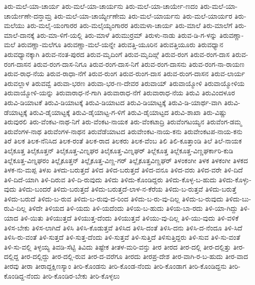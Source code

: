 ತಿರು-ಮಲೆ-ಯಾ-ಚಾರ್ಯ
ತಿರು-ಮಲೆ-ಯಾ-ಚಾರ್ಯನು
ತಿರು-ಮಲೆ-ಯಾ-ಚಾರ್ಯೇ-ಣದಂ
ತಿರು-ಮಲೆ-ಯಾ-ಚಾರ್ಯೇಣೇ-ದನ್ತಾಮ್ರ
ತಿರು-ಮಲೆ-ಯಾ-ಚಾರ್ಯ್ಯೇಣೇಮ
ತಿರು-ಮಲೆ-ಯಾರ್ಯನು
ತಿರು-ಮಲೆ-ಯಾರ್ಯರ
ತಿರು-ಮಲೆಯು
ತಿರು-ಮಲೈ-ಯಂಗಾರರ
ತಿರು-ಮಲೈಯ್ಯಂಗಾರರ
ತಿರುಮಳಾ-ಚಾರ್ಯ
ತಿರು-ಮಾಲೆ
ತಿರು-ಮಾಲೆಗೆ
ತಿರು-ಮಾಲೆ-ದಾನಕ್ಕೆ
ತಿರು-ಮಾ-ಳಿಗೆ-ಯಲ್ಲಿ
ತಿರು-ಮಾಳೆ
ತಿರುಮುರ್ರಮ್
ತಿರುಳು-ನಾಡು
ತಿರುವ-ಡಿ-ಗ-ಳನ್ನು
ತಿರುವಣ್ಣಾ-ಮಲೆ
ತಿರುವಣ್ಣಾ-ಮಲೆಗೂ
ತಿರುವಣ್ಣಾ-ಮಲೆ-ಯನ್ನೇ
ತಿರುವತ್ತಿ-ಯೂರಿನ
ತಿರುವತ್ತಿಯೂರು
ತಿರುವಧ್ಯಾನ
ತಿರುವಧ್ಯಾನಕ್ಕಾಗಿ
ತಿರುವ-ನಂತ-ಪುರದ
ತಿರುವ-ಮೃದಿಂಗೆ
ತಿರುವ-ಮೃದಿಙ್ಗೆ
ತಿರುವ-ರಂಗ
ತಿರುವ-ರಂಗ-ದಾಸ
ತಿರುವ-ರಂಗ-ದಾಸನ
ತಿರುವ-ರಂಗ-ದಾಸ-ನಿಗೂ
ತಿರುವ-ರಂಗ-ದಾಸ-ನಿಗೆ
ತಿರುವ-ರಂಗ-ದಾಸನು
ತಿರುವ-ರಂಗ-ನಾ-ರಾಯಣ
ತಿರುವ-ರಾಧ-ನೆಯ
ತಿರುವ-ರಾಧಾ-ನೆಗೆ
ತಿರುವ-ರುಂಗ
ತಿರುವ-ರುಂಗ-ದಾಸ
ತಿರುವ-ರುಂಗ-ದಾಸನ
ತಿರುವ-ಲಾರ್ಯ
ತಿರುವಲ್ಲಾಳ
ತಿರುವವ್ವೆ
ತಿರುವಾ-ಭರಣ
ತಿರುವಾ-ಭರ-ಣ-ದೇವರ
ತಿರುವಾಯ್
ತಿರುವಾಯ್ಮೋಳಿ
ತಿರುವಾಯ್ಮೋಳಿಯ
ತಿರುವಾಯ್ಮೋಳಿ-ಯನ್ನು
ತಿರುವಾರಾಧ-ನೆ-ಗಾಗಿ
ತಿರುವಾರಾಧ-ನೆಗೆ
ತಿರುವಾರಾಧ-ನೆಯ
ತಿರುವಿ
ತಿರುವಿಂದಳೂರ
ತಿರುವಿ-ಡಿಯಾಟಕೆ
ತಿರುವಿ-ಡಿಯಾಟಕ್ಕೆ
ತಿರುವಿ-ಡಿಯಾಟದ
ತಿರುವಿ-ಡಿಯಾಟ್ಟಕ್ಕೆ
ತಿರುವಿ-ಡಿ-ಯಾರ್ಥ-ವಾಗಿ
ತಿರುವಿ-ಡೆಯಾಟ್ಟಕ್ಕೆ
ತಿರುವಿ-ಡೈಯಾಟ್ಟಕ್ಕೆ
ತಿರುವಿ-ಡೈಯಾಟ್ಟ-ಗ-ಳಿಗೆ
ತಿರುವಿ-ಡೈಯಾಟ್ಟದ
ತಿರುವಿ-ಶಾಖಾ
ತಿರು-ವಿಷ್ಣು
ತಿರುವುರಲಿ
ತಿರು-ವೆಂಕಟ-ನಾಥ-ನಿಗೆ
ತಿರು-ವೆಂಕಟ-ನಾಯಕ
ತಿರು-ವೆಂಕಟಾದ್ರಿ
ತಿರುವೆಂಗಟಯ್ಯನ
ತಿರುವೆಂಗ-ಡಮ್ಮ
ತಿರುವೆಂಗಳ-ನಾಥ
ತಿರುವೆಂಗಳ-ನಾಥನ
ತಿರುವೆಡೆಯಾಟದ
ತಿರುವೇಂಕಟ-ನಾಯ-ಕನು
ತಿರುವೇಂಕಟಪ-ನಾಯ-ಕನು
ತಿರೆ
ತಿಲಕ
ತಿಲಕ-ನೆನಿಸಿದ
ತಿಲಕ-ರಂತೆ
ತಿಲಕ-ರಾದ
ತಿಲಕರು
ತಿಲಕ-ವೆಂಬ
ತಿಲಿ
ತಿಲಿ-ಕೂತ್ತಾಂಡಿ
ತಿಲೆ
ತಿಲೆ-ನಾಯಕ
ತಿಲೈಕೂತ್ತ
ತಿಲೈಕೂತ್ತನ್
ತಿಲೈಕೂತ್ತ-ವಿಣ್ನಘರ
ತಿಲೈಕೂತ್ತ-ವಿಣ್ನಘರ್
ತಿಲ್ಲೆಕೂತ್ತ
ತಿಲ್ಲೆಕೂತ್ತ-ವಿಣ್ಣಘರ್ಕಾರಿ-ಕುಡಿ
ತಿಲ್ಲೆಕೂತ್ತ-ವಿಣ್ನಘರಂ
ತಿಲ್ಲೈಕೂತ್ತನ್
ತಿಲ್ಲೈಕೂತ್ತ-ವಿಣ್ಣ-ಗರ್
ತಿಲ್ಲೈಕೂತ್ತವಿಣ್ಣಘರ್
ತಿಳಂಕಂಗೀ
ತಿಳಕ
ತಿಳಕಂಗೀ
ತಿಳಕದ
ತಿಳಕ-ನು-ಮಪ್ಪ
ತಿಳಖ
ತಿಳದು-ಬರುತ್ತದೆ
ತಿಳಿದ
ತಿಳಿದ-ಬರುತ್ತದೆ
ತಿಳಿದ-ವನೂ
ತಿಳಿದ-ವರು
ತಿಳಿದ-ವರೇ
ತಿಳಿ-ದಿದೆ
ತಿಳಿ-ದಿದೆ-ಯಾಗಿ
ತಿಳಿ-ದಿರುವ
ತಿಳಿ-ದಿ-ರುವುದು
ತಿಳಿದು
ತಿಳಿದು-ಕೊಂಡಿದ್ದರು
ತಿಳಿದು-ಕೊಳ್ಳ-ಬ-ಹುದು
ತಿಳಿದು-ಕೊಳ್ಳು-ವುದು
ತಿಳಿದು-ಬಂದರೆ
ತಿಳಿದು-ಬರುತ್ತದೆ
ತಿಳಿದು-ಬರುತ್ತದೆ-ಲಾಳ-ನ-ಕೆರೆಯ
ತಿಳಿದು-ಬ-ರುತ್ತವೆ
ತಿಳಿದು-ಬರುತ್ತೆ
ತಿಳಿದು-ಬರುದೆ
ತಿಳಿದು-ಬ-ರುವ
ತಿಳಿದು-ಬ-ರುವು-ದ-ರಿಂದ
ತಿಳಿದು-ಬ-ರು-ವು-ದಿಲ್ಲ
ತಿಳಿದು-ಬ-ರುವುದು
ತಿಳಿದು-ಬು-ರುವಿ-ದಿಲ್ಲ
ತಿಳಿದೇ
ತಿಳಿಯದ
ತಿಳಿ-ಯದು
ತಿಳಿ-ಯದೆಂದು
ತಿಳಿಯ-ಬ-ಹುದು
ತಿಳಿಯ-ಬಾ-ರದು
ತಿಳಿ-ಯಾ-ಗಿದ್ದು
ತಿಳಿ-ಯಾದ
ತಿಳಿ-ಯಿತು
ತಿಳಿಯುತ್ತದೆ
ತಿಳಿಯುತ್ತ-ದೆಂದು
ತಿಳಿಯುತ್ತವೆ
ತಿಳಿಯು-ವು-ದಿಲ್ಲ
ತಿಳಿ-ಯು-ವುದು
ತಿಳಿ-ವಳಿಕೆ
ತಿಳಿಸ-ಬೇಕು
ತಿಳಿಸ-ಲಾಗಿದೆ
ತಿಳಿಸಿ
ತಿಳಿಸಿ-ಕೊಡುತ್ತವೆ
ತಿಳಿಸಿದ
ತಿಳಿಸಿ-ದಂತೆ
ತಿಳಿಸಿ-ದನು
ತಿಳಿಸಿ-ದ-ನೆಂದೂ
ತಿಳಿ-ಸಿದೆ
ತಿಳಿಸಿ-ರು-ವಂತೆ
ತಿಳಿ-ಸುತ್ತದೆ
ತಿಳಿ-ಸುತ್ತ-ದೆಂದು
ತಿಳಿ-ಸುತ್ತವೆ
ತಿಳಿ-ಸುತ್ತಿದೆ
ತಿಳಿಸುತ್ತಿದ್ದರು
ತಿಳಿ-ಸುವ
ತಿಳಿ-ಸು-ವಂತೆ
ತಿಳಿ-ಸು-ವಲ್ಲಿ
ತಿಳ್ಳಯ್ಯ
ತಿವಡಿ-ಸೆಟ್ಟಿ
ತಿವಿದು
ತಿಷ್ಟೇಕ
ತೀತಳ-ಮರಿ-ವನ್ತು
ತೀರ
ತೀರದ
ತೀರ-ದಲ್ಲಿ
ತೀರ-ದಲ್ಲಿತ್ತು
ತೀರ-ದಲ್ಲಿದ್ದ
ತೀರ-ದಲ್ಲಿದ್ದು
ತೀರ-ದಲ್ಲಿ-ರುವ
ತೀರ-ದ-ವರೆಗೂ
ತೀರದು
ತೀರಪ್ರ-ದೇಶ
ತೀರ-ವಾಗಿ-ರ-ಬ-ಹುದು
ತೀರ-ವಾದ
ತೀರವು
ತೀರಾ
ತೀರಾದ್ದಕ್ಷಿಣಸ್ಯಾಂ
ತೀರಿ-ಕೊಂಡನು
ತೀರಿ-ಕೊಂಡ-ನೆಂದು
ತೀರಿ-ಕೊಂಡಾಗ
ತೀರಿ-ಕೊಂಡಿದ್ದನು
ತೀರಿ-ಕೊಂಡಿದ್ದ-ನೆಂದು
ತೀರಿ-ಕೊಂಡಿರ-ಬೇಕು
ತೀರಿ-ಕೊಳ್ಳಲು
